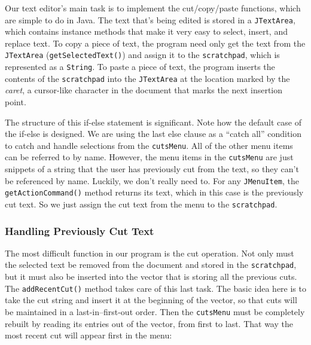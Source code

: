 Our text editor's main task is to implement the cut/copy/paste
functions, which are simple to do in Java. The text that's being
edited is stored in a {\tt JTextArea}, which contains instance methods
that make it very easy to select, insert, and replace text. To copy a
piece of text, the program need only get the text from the
{\tt JTextArea} ({\tt getSelectedText()}) and assign it to the
{\tt scratchpad}, which is represented as a {\tt String}. To paste a piece
of text, the program inserts the contents of the {\tt scratchpad} into
the {\tt JTextArea} at the location marked by the {\it caret}, a
cursor-like character in the document that marks the next insertion
point.


The structure of this if-else statement is significant. Note how the
default case of the if-else is designed. We are using the last else
clause as a ``catch all'' condition to catch and handle selections
from the {\tt cutsMenu}.  All of the other
menu items can be referred to by name. However, the menu items in the
{\tt cutsMenu} are just snippets of a string that the user has
previously cut from the text, so they can't be referenced by
name. Luckily, we don't really need to. For any {\tt JMenuItem}, the
{\tt getActionCommand()} method returns its text, which in this case
is the previously cut text. So we just assign the cut text from the
menu to the {\tt scratchpad}.



\subsubsection*{Handling Previously Cut Text}
\noindent The most difficult function in our program is the cut operation. Not
only must the selected text be removed from the document and stored in
the {\tt scratchpad}, but it must also be inserted into the vector that is
storing all the previous cuts. The {\tt addRecentCut()} method takes
care of this last task. The basic idea here is to take the cut string
and insert it at the beginning of the vector, so that cuts will be
maintained in a last-in--first-out order. Then the {\tt cutsMenu} must
be completely rebuilt by reading its entries out of the vector, from
first to last. That way the most recent cut will appear first in the
menu:

